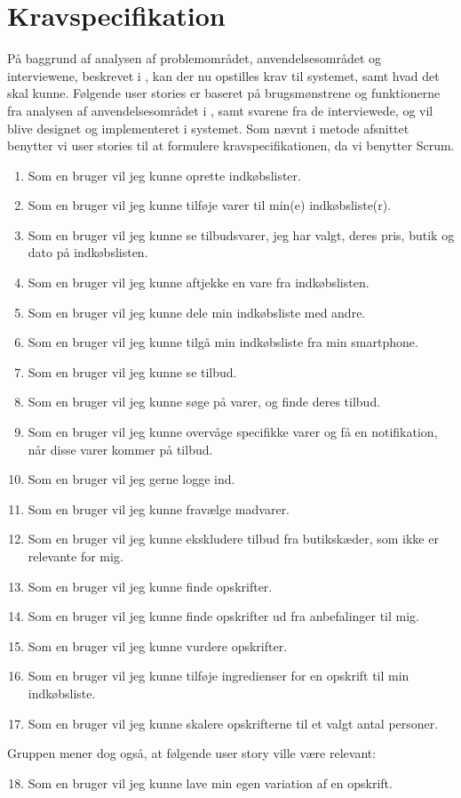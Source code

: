 \section{Kravspecifikation}\label{sec:krav}

På baggrund af analysen af problemområdet, anvendelsesområdet og interviewene, beskrevet i , kan der nu opstilles krav til systemet, samt hvad det skal kunne.
Følgende user stories er baseret på brugsmønstrene og funktionerne fra analysen af anvendelsesområdet i , samt svarene fra de interviewede, og vil blive designet og implementeret i systemet.
Som nævnt i metode afsnittet benytter vi user stories til at formulere kravspecifikationen, da vi benytter Scrum.
\vspace{-12pt}
\begin{enumerate}
	\item Som en bruger vil jeg kunne oprette indkøbslister.
	\item Som en bruger vil jeg kunne tilføje varer til min(e) indkøbsliste(r).
	\item Som en bruger vil jeg kunne se tilbudsvarer, jeg har valgt, deres pris, butik og dato på indkøbslisten.
	\item Som en bruger vil jeg kunne aftjekke en vare fra indkøbslisten.
	\item Som en bruger vil jeg kunne dele min indkøbsliste med andre.
	\item Som en bruger vil jeg kunne tilgå min indkøbsliste fra min smartphone.
			
	\item Som en bruger vil jeg kunne se tilbud.
	\item Som en bruger vil jeg kunne søge på varer, og finde deres tilbud. 
	\item Som en bruger vil jeg kunne overvåge specifikke varer og få en notifikation, når disse varer kommer på tilbud.
	\item Som en bruger vil jeg gerne logge ind.
	\item Som en bruger vil jeg kunne fravælge madvarer.
	\item Som en bruger vil jeg kunne ekskludere tilbud fra butikskæder, som ikke er relevante for mig.
	\item Som en bruger vil jeg kunne finde opskrifter.
	\item Som en bruger vil jeg kunne finde opskrifter ud fra anbefalinger til mig.
	\item Som en bruger vil jeg kunne vurdere opskrifter.
	\item Som en bruger vil jeg kunne tilføje ingredienser for en opskrift til min indkøbsliste.
	\item Som en bruger vil jeg kunne skalere opskrifterne til et valgt antal personer.
\end{enumerate}
\vspace{-8pt}
Gruppen mener dog også, at følgende user story ville være relevant: 
\vspace{-12pt}
\begin{enumerate}
\setcounter{enumi}{17}
	\item Som en bruger vil jeg kunne lave min egen variation af en opskrift.
\end{enumerate}

